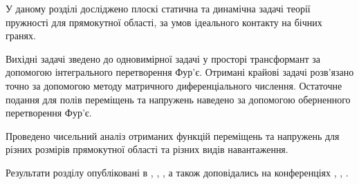 У даному розділі досліджено плоскі статична та динамічна задачі теорії пружності для прямокутної області,
за умов ідеального контакту на бічних гранях.

Вихідні задачі зведено до одновимірної задачі у просторі трансформант за допомогою інтегрального перетворення Фур'є.
Отримані крайові задачі розв'язано точно за допомогою методу матричного диференціального числення.
Остаточне подання для полів переміщень та напружень наведено за допомогою оберненного перетворення Фур'є.

Проведено чисельний аналіз отриманих функцій переміщень та напружень для різних розмірів прямокутної області та різних видів навантаження.

Результати розділу опубліковані в \cite{pozhylenkov_1}, \cite{pozhylenkov_2}, \cite{pozhylenkov_3}, \cite{pozhylenkov_5}
а також доповідались на конференціях \cite{conf_1}, \cite{conf_2}, \cite{conf_4}.
